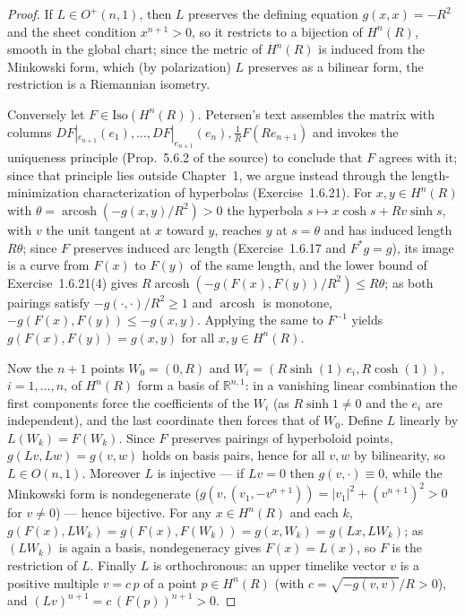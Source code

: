 \begin{proof}
  \leanok
  If $L\in O^+(n,1)$, then $L$ preserves the defining equation
  $g(x,x)=-R^2$ and the sheet condition $x^{n+1}>0$, so it restricts to a
  bijection of $H^n(R)$, smooth in the global chart; since the metric of
  $H^n(R)$ is induced from the Minkowski form, which (by polarization) $L$
  preserves as a bilinear form, the restriction is a Riemannian isometry.

  Conversely let $F\in\mathrm{Iso}(H^n(R))$. Petersen's text assembles the
  matrix with columns
  $DF|_{e_{n+1}}(e_1),\dots,DF|_{e_{n+1}}(e_n),\tfrac1RF(Re_{n+1})$ and
  invokes the uniqueness principle (Prop.~5.6.2 of the source) to conclude
  that $F$ agrees with it; since that principle lies outside Chapter~1, we
  argue instead through the length-minimization characterization of
  hyperbolas (Exercise~1.6.21). For $x,y\in H^n(R)$ with
  $\theta=\operatorname{arcosh}(-g(x,y)/R^2)>0$ the hyperbola
  $s\mapsto x\cosh s+Rv\sinh s$, with $v$ the unit tangent at $x$ toward
  $y$, reaches $y$ at $s=\theta$ and has induced length $R\theta$; since
  $F$ preserves induced arc length (Exercise~1.6.17 and $F^*g=g$), its
  image is a curve from $F(x)$ to $F(y)$ of the same length, and the lower
  bound of Exercise~1.6.21(4) gives
  $R\operatorname{arcosh}(-g(F(x),F(y))/R^2)\le R\theta$; as both pairings
  satisfy $-g(\cdot,\cdot)/R^2\ge1$ and $\operatorname{arcosh}$ is monotone,
  $-g(F(x),F(y))\le-g(x,y)$. Applying the same to $F^{-1}$ yields
  $g(F(x),F(y))=g(x,y)$ for all $x,y\in H^n(R)$.

  Now the $n+1$ points $W_0=(0,R)$ and $W_i=(R\sinh(1)\,e_i,R\cosh(1))$,
  $i=1,\dots,n$, of $H^n(R)$ form a basis of $\mathbb{R}^{n,1}$: in a
  vanishing linear combination the first components force the coefficients
  of the $W_i$ (as $R\sinh1\neq0$ and the $e_i$ are independent), and the
  last coordinate then forces that of $W_0$. Define $L$ linearly by
  $L(W_k)=F(W_k)$. Since $F$ preserves pairings of hyperboloid points,
  $g(Lv,Lw)=g(v,w)$ holds on basis pairs, hence for all $v,w$ by
  bilinearity, so $L\in O(n,1)$. Moreover $L$ is injective — if $Lv=0$
  then $g(v,\cdot)\equiv0$, while the Minkowski form is nondegenerate
  ($g(v,(v_1,-v^{n+1}))=|v_1|^2+(v^{n+1})^2>0$ for $v\neq0$) — hence
  bijective. For any $x\in H^n(R)$ and each $k$,
  $g(F(x),LW_k)=g(F(x),F(W_k))=g(x,W_k)=g(Lx,LW_k)$; as $(LW_k)$ is again
  a basis, nondegeneracy gives $F(x)=L(x)$, so $F$ is the restriction of
  $L$. Finally $L$ is orthochronous: an upper timelike vector $v$ is a
  positive multiple $v=c\,p$ of a point $p\in H^n(R)$ (with
  $c=\sqrt{-g(v,v)}/R>0$), and $(Lv)^{n+1}=c\,(F(p))^{n+1}>0$.
\end{proof}

